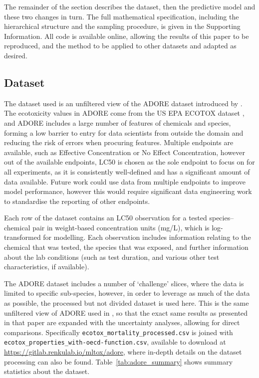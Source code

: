 The remainder of the section describes the dataset, then the predictive model and these two changes in turn. The full mathematical specification, including the hierarchical structure and the sampling procedure, is given in the Supporting Information. All code is available online, allowing the results of this paper to be reproduced, and the method to be applied to other datasets and adapted as desired. 


\subsection{Dataset}

The dataset used is an unfiltered view of the ADORE dataset introduced by \citet{ADORE}. The ecotoxicity values in ADORE come from the US EPA ECOTOX dataset \citep{ECOTOX}, and ADORE includes a large number of features of chemicals and species, forming a low barrier to entry for data scientists from outside the domain and reducing the risk of errors when procuring features. Multiple endpoints are available, such as Effective Concentration or No Effect Concentration, however out of the available endpoints, LC50 is chosen as the sole endpoint to focus on for all experiments, as it is consistently well-defined and has a significant amount of data available. Future work could use data from multiple endpoints to improve model performance, however this would require significant data engineering work to standardise the reporting of other endpoints.

Each row of the dataset contains an LC50 observation for a tested species--chemical pair in weight-based concentration units (mg/L), which is log-transformed for modelling. Each observation includes information relating to the chemical that was tested, the species that was exposed, and further information about the lab conditions (such as test duration, and various other test characteristics, if available).

The ADORE dataset includes a number of `challenge' slices, where the data is limited to specific sub-species, however, in order to leverage as much of the data as possible, the processed but not divided dataset is used here. This is the same unfiltered view of ADORE used in \citet{PosthumaImprovingHazard}, so that the exact same results as presented in that paper are expanded with the uncertainty analyses, allowing for direct comparisons. Specifically \texttt{ecotox\_mortality\_processed.csv} is joined with \texttt{ecotox\_properties\_with-oecd-function.csv}, available to download at \url{https://gitlab.renkulab.io/mltox/adore}, where in-depth details on the dataset processing can also be found. Table~\ref{tab:adore_summary} shows summary statistics about the dataset.

